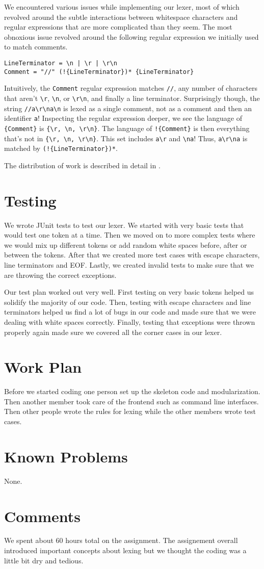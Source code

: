 \documentclass{hw}
\begin{document}
We encountered various issues while implementing our lexer, most of which
revolved around the subtle interactions between whitespace characters and
regular expressions that are more complicated than they seem. The most
obnoxious issue revolved around the following regular expression we initially
used to match comments.

\begin{center}
\begin{BVerbatim}
LineTerminator = \n | \r | \r\n
Comment = "//" (!{LineTerminator})* {LineTerminator}
\end{BVerbatim}
\end{center}

Intuitively, the \texttt{Comment} regular expression matches \texttt{//}, any
number of characters that aren't \verb$\r$, \verb$\n$, or \verb$\r\n$, and
finally a line terminator. Surprisingly though, the string \verb$//a\r\na\n$ is
lexed as a single comment, not as a comment and then an identifier \verb$a$!
Inspecting the regular expression deeper, we see the language of
\verb${Comment}$ is \verb${\r, \n, \r\n}$. The language of \verb$!{Comment}$ is
then everything that's not in \verb${\r, \n, \r\n}$. This set includes
\verb$a\r$ and \verb$\na$! Thus, \verb$a\r\na$ is matched by
\verb$(!{LineTerminator})*$.

The distribution of work is described in detail in .

\section{Testing}\label{sec:testing}
We wrote JUnit tests to test our lexer. We started with very basic tests that
would test one token at a time. Then we moved on to more complex tests where
we would mix up different tokens or add random white spaces before, after or between the
tokens. After that we created more test cases with escape characters, line terminators
and EOF. Lastly, we created invalid tests to make sure that we are throwing the correct
exceptions.

Our test plan worked out very well. First testing on very basic tokens helped us solidify
the majority of our code. Then, testing with escape characters and line terminators helped
us find a lot of bugs in our code and made sure that we were dealing with white spaces correctly.
Finally, testing that exceptions were thrown properly again made sure we covered all the corner
cases in our lexer.
\section{Work Plan}\label{sec:workplan}
Before we started coding one person set up the skeleton code and modularization. Then another
member took care of the frontend such as command line interfaces. Then other people
wrote the rules for lexing while the other members wrote test cases.
\section{Known Problems}\label{sec:problems}
None.
\section{Comments}\label{sec:comments}
We spent about 60 hours total on the assignment. The assignement overall introduced
important concepts about lexing but we thought the coding was a little bit dry and tedious.
\end{document}
